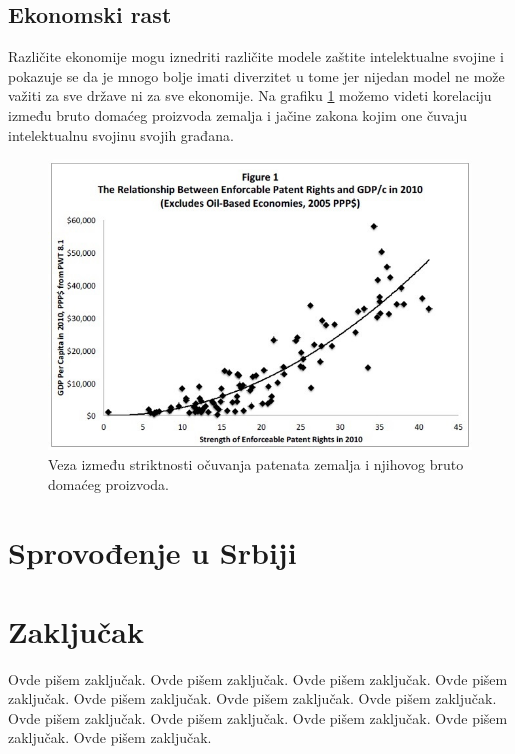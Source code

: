 \documentclass[a4paper]{article}
\begin{document}
\label{subsec:fin}

\subsection{Ekonomski rast}
\label{subsec:ekon}

Različite ekonomije mogu iznedriti različite modele zaštite intelektualne
svojine i pokazuje se da je mnogo bolje imati diverzitet u tome jer nijedan
model ne može važiti za sve države ni za sve ekonomije. Na grafiku \ref{fig:pat_gdp} možemo videti korelaciju između bruto domaćeg proizvoda zemalja i jačine zakona kojim one čuvaju intelektualnu svojinu svojih građana.

\begin{figure}[h!]
\begin{center}
\includegraphics[scale=0.75]{patents_and_gdp.jpg}
\end{center}
\caption{Veza između striktnosti očuvanja patenata zemalja i njihovog bruto domaćeg proizvoda.}
\label{fig:pat_gdp}
\end{figure}

\section{Sprovođenje u Srbiji}
\label{sec:srb}

\section{Zaključak}
\label{sec:zakljucak}

Ovde pišem zaključak. 
Ovde pišem zaključak. 
Ovde pišem zaključak. 
Ovde pišem zaključak. 
Ovde pišem zaključak. 
Ovde pišem zaključak. 
Ovde pišem zaključak. 
Ovde pišem zaključak. 
Ovde pišem zaključak. 
Ovde pišem zaključak. 
Ovde pišem zaključak. 
Ovde pišem zaključak. 


\appendix
 

\end{document}
